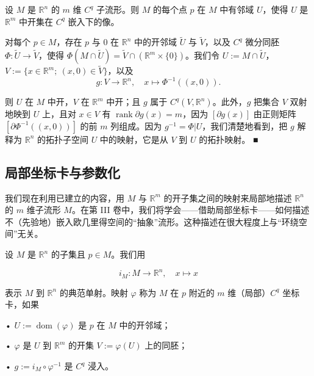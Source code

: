 \begin{theorem}

设 $ M $ 是 $ \mathbb{R}^{n} $ 的 $ m $ 维 $ C^{q} $ 子流形。则 $ M $ 的每个点 $ p $ 在 $ M $ 中有邻域 $ U $，使得 $ U $ 是 $ \mathbb{R}^{m} $ 中开集在 $ C^{q} $ 嵌入下的像。

\proofhead
对每个 $ p \in M $，存在 $ p $ 与 0 在 $ \mathbb{R}^{n} $ 中的开邻域 $ \tilde{U} $ 与 $ \tilde{V} $，以及 $ C^{q} $ 微分同胚 $ \Phi : \tilde{U} \to \tilde{V} $，使得 $ \Phi(M \cap \tilde{U}) = \tilde{V} \cap (\mathbb{R}^{m} \times \{0\}) $。我们令 $ U := M \cap \tilde{U} $，$ V := \{x \in \mathbb{R}^{m} ; \ (x, 0) \in \tilde{V}\} $，以及
\[
g : V \to \mathbb{R}^{n} , \quad x \mapsto \Phi^{-1}((x, 0)) .
\]

则 $ U $ 在 $ M $ 中开，$ V $ 在 $ \mathbb{R}^{m} $ 中开；且 $ g $ 属于 $ C^{q}(V, \mathbb{R}^{n}) $。此外，$ g $ 把集合 $ V $ 双射地映到 $ U $ 上，且对 $ x \in V $ 有 $ \operatorname{rank}\partial g(x) = m $，因为 $ [\partial g(x)] $ 由正则矩阵 $ [\partial\Phi^{-1}((x, 0))] $ 的前 $ m $ 列组成。因为 $ g^{-1} = \Phi|U $，我们清楚地看到，把 $ g $ 解释为 $ \mathbb{R}^{n} $ 的拓扑子空间 $ U $ 中的映射，它是从 $ V $ 到 $ U $ 的拓扑映射。 \nobreak\hspace{0.35em}■

\end{theorem}

\subsection*{局部坐标卡与参数化}

我们现在利用已建立的内容，用 $ M $ 与 $ \mathbb{R}^{m} $ 的开子集之间的映射来局部地描述 $ \mathbb{R}^{n} $ 的 $ m $ 维子流形 $ M $。在第 III 卷中，我们将学会——借助局部坐标卡——如何描述不（先验地）嵌入欧几里得空间的“抽象”流形。这种描述在很大程度上与“环绕空间”无关。

设 $ M $ 是 $ \mathbb{R}^{n} $ 的子集且 $ p \in M $。我们用

\[
i_{M} : M \to \mathbb{R}^{n} , \quad x \mapsto x
\]

表示 $ M $ 到 $ \mathbb{R}^{n} $ 的典范单射。映射 $ \varphi $ 称为 $ M $ 在 $ p $ 附近的 $ m $ 维（局部）$ C^{q} $ 坐标卡，如果

• $ U := \operatorname{dom}(\varphi) $ 是 $ p $ 在 $ M $ 中的开邻域；

• $ \varphi $ 是 $ U $ 到 $ \mathbb{R}^{m} $ 的开集 $ V := \varphi(U) $ 上的同胚；

• $ g := i_{M} \circ \varphi^{-1} $ 是 $ C^{q} $ 浸入。


